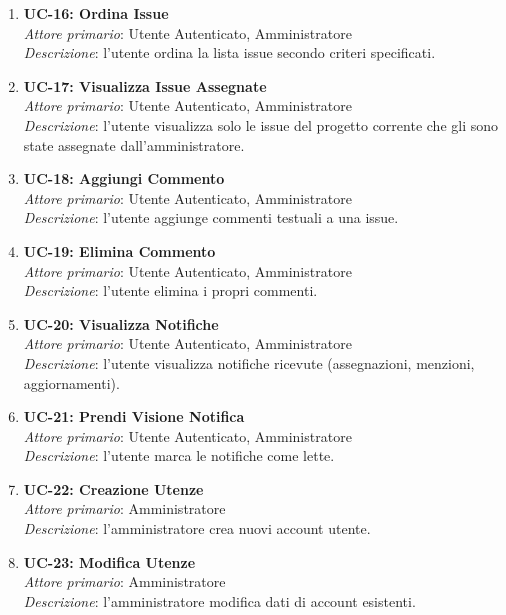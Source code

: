 \begin{enumerate}[leftmargin=1.1em]
\item \textbf{UC-16: Ordina Issue} \\
\textit{Attore primario}: Utente Autenticato, Amministratore \\
\textit{Descrizione}: l'utente ordina la lista issue secondo criteri specificati.

\item \textbf{UC-17: Visualizza Issue Assegnate} \\
\textit{Attore primario}: Utente Autenticato, Amministratore \\
\textit{Descrizione}: l'utente visualizza solo le issue del progetto corrente che gli sono state assegnate dall'amministratore.

\item \textbf{UC-18: Aggiungi Commento} \\
\textit{Attore primario}: Utente Autenticato, Amministratore \\
\textit{Descrizione}: l'utente aggiunge commenti testuali a una issue.

\item \textbf{UC-19: Elimina Commento} \\
\textit{Attore primario}: Utente Autenticato, Amministratore \\
\textit{Descrizione}: l'utente elimina i propri commenti.

\item \textbf{UC-20: Visualizza Notifiche} \\
\textit{Attore primario}: Utente Autenticato, Amministratore \\
\textit{Descrizione}: l'utente visualizza notifiche ricevute (assegnazioni, menzioni, aggiornamenti).

\item \textbf{UC-21: Prendi Visione Notifica} \\
\textit{Attore primario}: Utente Autenticato, Amministratore \\
\textit{Descrizione}: l'utente marca le notifiche come lette.

\item \textbf{UC-22: Creazione Utenze} \\
\textit{Attore primario}: Amministratore \\
\textit{Descrizione}: l'amministratore crea nuovi account utente.

\item \textbf{UC-23: Modifica Utenze} \\
\textit{Attore primario}: Amministratore \\
\textit{Descrizione}: l'amministratore modifica dati di account esistenti.


\end{enumerate}
